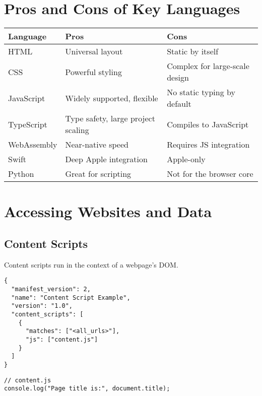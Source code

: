 \documentclass[12pt,a4paper]{article}
\begin{document}
\section{Pros and Cons of Key Languages}
\renewcommand{\arraystretch}{1.2}
\begin{center}
  \begin{tabular}{|m{3cm}|m{5cm}|m{5cm}|}
    \hline
    \textbf{Language} & \textbf{Pros}                      & \textbf{Cons}                  \\
    \hline
    HTML              & Universal layout                   & Static by itself               \\
    \hline
    CSS               & Powerful styling                   & Complex for large-scale design \\
    \hline
    JavaScript        & Widely supported, flexible         & No static typing by default    \\
    \hline
    TypeScript        & Type safety, large project scaling & Compiles to JavaScript         \\
    \hline
    WebAssembly       & Near-native speed                  & Requires JS integration        \\
    \hline
    Swift             & Deep Apple integration             & Apple-only                     \\
    \hline
    Python            & Great for scripting                & Not for the browser core       \\
    \hline
  \end{tabular}
\end{center}

\section{Accessing Websites and Data}
\subsection{Content Scripts}
Content scripts run in the context of a webpage’s DOM.

\begin{verbatim}
{
  "manifest_version": 2,
  "name": "Content Script Example",
  "version": "1.0",
  "content_scripts": [
    {
      "matches": ["<all_urls>"],
      "js": ["content.js"]
    }
  ]
}
\end{verbatim}

\begin{verbatim}
// content.js
console.log("Page title is:", document.title);
\end{verbatim}
\end{document}
